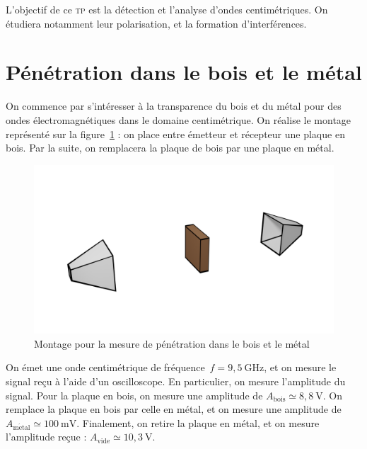 \documentclass[a4paper,twocolumn,10pt,margin=0.5in]{extreport}
\def\res#1{{\color{cyan}#1}}
\begin{document}
	L'objectif de ce \textsc{tp} est la détection et l'analyse d'ondes centimétriques.
	On étudiera notamment leur polarisation, et la formation d'interférences.

	\bigskip

	\section{Pénétration dans le bois et le métal}

	On commence par s'intéresser à la transparence du bois et du métal pour des ondes électromagnétiques dans le domaine centimétrique.
	On réalise le montage représenté sur la figure~\ref{fig:montage-transparence} : on place entre émetteur et récepteur une plaque en bois. Par la suite, on remplacera la plaque de bois par une plaque en métal.
		
	\begin{figure}[H]
		\centering
		\vspace{-1cm}
		\includegraphics[width=\linewidth]{figures/montage-1.png}
		\vspace{-1cm}
		\caption{Montage pour la mesure de pénétration dans le bois et le métal}
		\label{fig:montage-transparence}
	\end{figure}

	On émet une onde centimétrique de fréquence~$f = 9{,}5\:\mathrm{GHz}$, et on mesure le signal reçu à l'aide d'un oscilloscope.
	En particulier, on mesure l'amplitude du signal.
	Pour la plaque en bois, on mesure une amplitude de \res{$A_{\mathrm{bois}} \simeq 8{,}8\:\mathrm{V}$}.
	On remplace la plaque en bois par celle en métal, et on mesure une amplitude de \res{$A_{\mathrm{m\acute{e}tal}} \simeq 100\:\mathrm{mV}$}.
	Finalement, on retire la plaque en métal, et on mesure l'amplitude reçue : \res{$A_\mathrm{vide} \simeq 10{,}3 \:\mathrm{V}$}.
\end{document}
